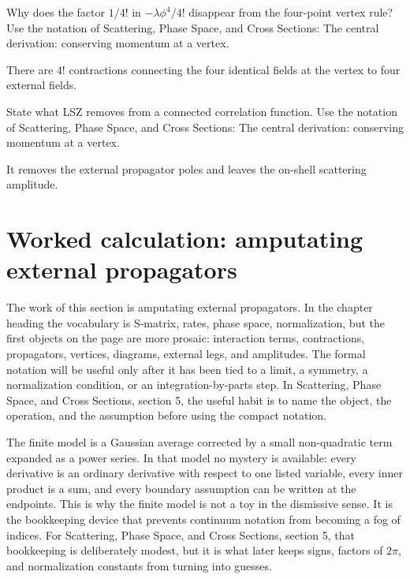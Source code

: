 \begin{exercise}
Why does the factor \(1/4!\) in \(-\lambda\phi^4/4!\) disappear from the four-point vertex rule?  Use the notation of Scattering, Phase Space, and Cross Sections: The central derivation: conserving momentum at a vertex.
\begin{answer}
There are \(4!\) contractions connecting the four identical fields at the vertex to four external fields.
\end{answer}
\end{exercise}

\begin{exercise}
State what LSZ removes from a connected correlation function.  Use the notation of Scattering, Phase Space, and Cross Sections: The central derivation: conserving momentum at a vertex.
\begin{answer}
It removes the external propagator poles and leaves the on-shell scattering amplitude.
\end{answer}
\end{exercise}



\section{Worked calculation: amputating external propagators}

The work of this section is amputating external propagators.  In the chapter heading the vocabulary is S-matrix, rates, phase space, normalization, but the first objects on the page are more prosaic: interaction terms, contractions, propagators, vertices, diagrams, external legs, and amplitudes.  The formal notation will be useful only after it has been tied to a limit, a symmetry, a normalization condition, or an integration-by-parts step.  In Scattering, Phase Space, and Cross Sections, section 5, the useful habit is to name the object, the operation, and the assumption before using the compact notation.

The finite model is a Gaussian average corrected by a small non-quadratic term expanded as a power series.  In that model no mystery is available: every derivative is an ordinary derivative with respect to one listed variable, every inner product is a sum, and every boundary assumption can be written at the endpoints.  This is why the finite model is not a toy in the dismissive sense.  It is the bookkeeping device that prevents continuum notation from becoming a fog of indices.  For Scattering, Phase Space, and Cross Sections, section 5, that bookkeeping is deliberately modest, but it is what later keeps signs, factors of \(2\pi\), and normalization constants from turning into guesses.

